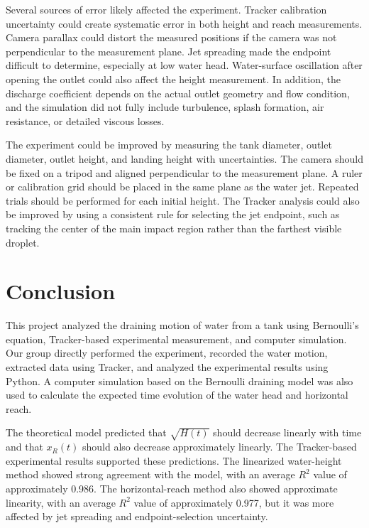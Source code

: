 \documentclass[11pt,letterpaper]{article}
\begin{document}
Several sources of error likely affected the experiment. Tracker calibration uncertainty could create systematic error in both height and reach measurements. Camera parallax could distort the measured positions if the camera was not perpendicular to the measurement plane. Jet spreading made the endpoint difficult to determine, especially at low water head. Water-surface oscillation after opening the outlet could also affect the height measurement. In addition, the discharge coefficient depends on the actual outlet geometry and flow condition, and the simulation did not fully include turbulence, splash formation, air resistance, or detailed viscous losses.

The experiment could be improved by measuring the tank diameter, outlet diameter, outlet height, and landing height with uncertainties. The camera should be fixed on a tripod and aligned perpendicular to the measurement plane. A ruler or calibration grid should be placed in the same plane as the water jet. Repeated trials should be performed for each initial height. The Tracker analysis could also be improved by using a consistent rule for selecting the jet endpoint, such as tracking the center of the main impact region rather than the farthest visible droplet.

\section{Conclusion}

This project analyzed the draining motion of water from a tank using Bernoulli's equation, Tracker-based experimental measurement, and computer simulation. Our group directly performed the experiment, recorded the water motion, extracted data using Tracker, and analyzed the experimental results using Python. A computer simulation based on the Bernoulli draining model was also used to calculate the expected time evolution of the water head and horizontal reach.

The theoretical model predicted that $\sqrt{H(t)}$ should decrease linearly with time and that $x_R(t)$ should also decrease approximately linearly. The Tracker-based experimental results supported these predictions. The linearized water-height method showed strong agreement with the model, with an average $R^2$ value of approximately 0.986. The horizontal-reach method also showed approximate linearity, with an average $R^2$ value of approximately 0.977, but it was more affected by jet spreading and endpoint-selection uncertainty.
\end{document}
